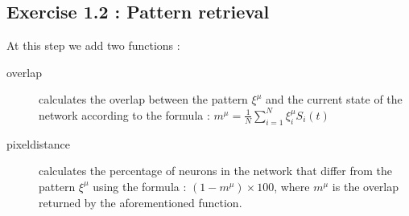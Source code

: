 \subsection{Exercise 1.2 : Pattern retrieval }
At this step we add two functions : 
\begin{description}
\item [overlap] calculates the overlap between the pattern $\xi^{\mu}$ and the current state of the network according to the formula : $m^{\mu} = \frac{1}{N}\sum_{i=1}^N \xi_i^{\mu}S_i(t)$
\item[pixeldistance] calculates the percentage of neurons in the network that differ from the pattern $\xi^{\mu}$ using the formula : $(1-m^{\mu}) \times 100$, where $m^{\mu}$ is the overlap returned by the aforementioned function. 
\end{description}

